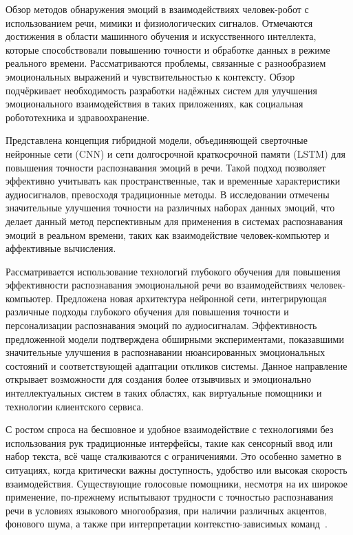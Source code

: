  Обзор методов обнаружения эмоций в взаимодействиях человек-робот с использованием речи, мимики и физиологических сигналов. Отмечаются достижения в области машинного обучения и искусственного интеллекта, которые способствовали повышению точности и обработке данных в режиме реального времени. Рассматриваются проблемы, связанные с разнообразием эмоциональных выражений и чувствительностью к контексту. Обзор подчёркивает необходимость разработки надёжных систем для улучшения эмоционального взаимодействия в таких приложениях, как социальная робототехника и здравоохранение.
	
 Представлена концепция гибридной модели, объединяющей сверточные нейронные сети (CNN) и сети долгосрочной краткосрочной памяти (LSTM) для повышения точности распознавания эмоций в речи. Такой подход позволяет эффективно учитывать как пространственные, так и временные характеристики аудиосигналов, превосходя традиционные методы. В исследовании отмечены значительные улучшения точности на различных наборах данных эмоций, что делает данный метод перспективным для применения в системах распознавания эмоций в реальном времени, таких как взаимодействие человек-компьютер и аффективные вычисления.
	
 Рассматривается использование технологий глубокого обучения для повышения эффективности распознавания эмоциональной речи во взаимодействиях человек-компьютер. Предложена новая архитектура нейронной сети, интегрирующая различные подходы глубокого обучения для повышения точности и персонализации распознавания эмоций по аудиосигналам. Эффективность предложенной модели подтверждена обширными экспериментами, показавшими значительные улучшения в распознавании нюансированных эмоциональных состояний и соответствующей адаптации откликов системы. Данное направление открывает возможности для создания более отзывчивых и эмоционально интеллектуальных систем в таких областях, как виртуальные помощники и технологии клиентского сервиса.
 
 С ростом спроса на бесшовное и удобное взаимодействие с технологиями без использования рук традиционные интерфейсы, такие как сенсорный ввод или набор текста, всё чаще сталкиваются с ограничениями. Это особенно заметно в ситуациях, когда критически важны доступность, удобство или высокая скорость взаимодействия. Существующие голосовые помощники, несмотря на их широкое применение, по-прежнему испытывают трудности с точностью распознавания речи в условиях языкового многообразия, при наличии различных акцентов, фонового шума, а также при интерпретации контекстно-зависимых команд~\cite{name22}.

